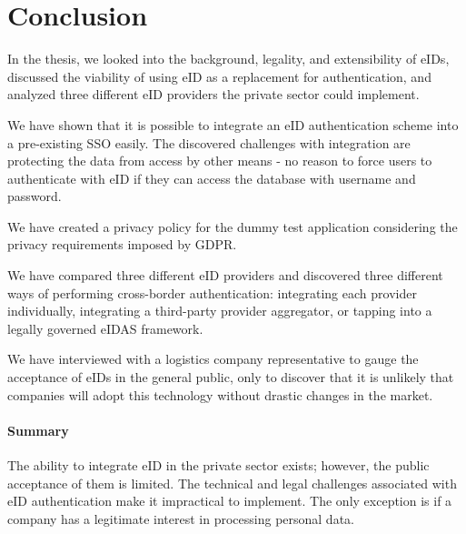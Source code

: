 \section{Conclusion}

In the thesis, we looked into the background, legality, and extensibility of eIDs, discussed the viability of using eID as a replacement for authentication, and analyzed three different eID providers the private sector could implement.

We have shown that it is possible to integrate an eID authentication scheme into a pre-existing SSO easily. The discovered challenges with integration are protecting the data from access by other means - no reason to force users to authenticate with eID if they can access the database with username and password.

We have created a privacy policy for the dummy test application considering the privacy requirements imposed by GDPR.

We have compared three different eID providers and discovered three different ways of performing cross-border authentication: integrating each provider individually, integrating a third-party provider aggregator, or tapping into a legally governed eIDAS framework.

We have interviewed with a logistics company representative to gauge the acceptance of eIDs in the general public, only to discover that it is unlikely that companies will adopt this technology without drastic changes in the market.

\paragraph{Summary} The ability to integrate eID in the private sector exists; however, the public acceptance of them is limited. The technical and legal challenges associated with eID authentication make it impractical to implement. The only exception is if a company has a legitimate interest in processing personal data.